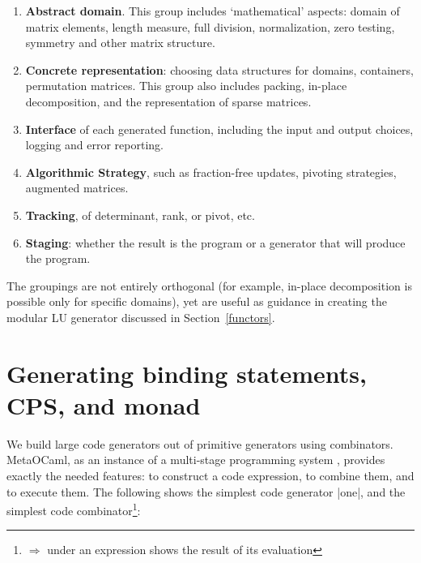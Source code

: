 \documentclass{elsart}
\newcommand{\oleg}[1]{{\it [Oleg says: #1]}}
\newcommand{\jacques}[1]{{\it [Jacques says: #1]}}
\begin{document}
\begin{enumerate}
    \item \textbf{Abstract domain}.  This group includes
      `mathematical' aspects: domain of matrix elements, length
      measure, full division, normalization, zero testing,
      symmetry and other matrix structure.
    \item \textbf{Concrete representation}: choosing data
      structures for domains, containers, permutation
      matrices. This group also includes packing, in-place
      decomposition, and the
      representation of sparse matrices.
    \item \textbf{Interface} of each generated function, including
      the input and output choices, logging and error reporting.
    \item \textbf{Algorithmic Strategy}, such as fraction-free
      updates, pivoting strategies, augmented matrices.
    \item \textbf{Tracking}, of determinant, rank, or pivot, etc.
    \item \textbf{Staging}: whether the result is the program or a
      generator that will produce the program.
\end{enumerate}


The groupings are not entirely orthogonal (for example, in-place
decomposition is possible only for specific domains), yet are useful
as guidance in creating the modular LU generator discussed in 
Section~\ref{functors}.

\section{Generating binding statements, CPS, and monad}\label{CPS}

We build large code generators out of primitive generators using 
combinators. MetaOCaml, as an instance of a multi-stage
programming system \cite{TahaThesis}, provides exactly the needed
features: to construct a code expression, to combine them, and to
execute them. The following shows the simplest code generator |one|,
and the simplest code combinator\footnote{%
$\Longrightarrow$ under an expression shows the result of its evaluation}:
\end{document}
